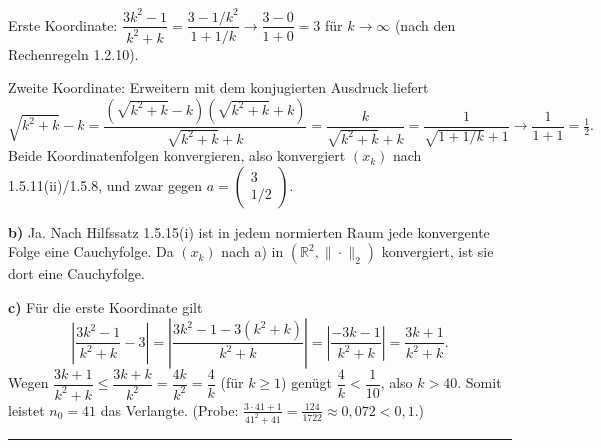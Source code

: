 \documentclass[a4paper,11pt]{article}
\begin{document}
Erste Koordinate: $\dfrac{3k^2-1}{k^2+k}=\dfrac{3-1/k^2}{1+1/k}\to \dfrac{3-0}{1+0}=3$ für $k\to\infty$ (nach den Rechenregeln 1.2.10).

Zweite Koordinate: Erweitern mit dem konjugierten Ausdruck liefert
\[ \sqrt{k^2+k}-k=\frac{(\sqrt{k^2+k}-k)(\sqrt{k^2+k}+k)}{\sqrt{k^2+k}+k}=\frac{k}{\sqrt{k^2+k}+k}=\frac{1}{\sqrt{1+1/k}+1}\to\frac{1}{1+1}=\tfrac12. \]
Beide Koordinatenfolgen konvergieren, also konvergiert $(x_k)$ nach 1.5.11(ii)/1.5.8, und zwar gegen $a=\begin{pmatrix}3\\ 1/2\end{pmatrix}$.

\textbf{b)} Ja. Nach Hilfssatz 1.5.15(i) ist in jedem normierten Raum jede konvergente Folge eine Cauchyfolge. Da $(x_k)$ nach a) in $(\mathbb{R}^2,\|\cdot\|_2)$ konvergiert, ist sie dort eine Cauchyfolge.

\textbf{c)} Für die erste Koordinate gilt
\[ \left|\frac{3k^2-1}{k^2+k}-3\right|=\left|\frac{3k^2-1-3(k^2+k)}{k^2+k}\right|=\left|\frac{-3k-1}{k^2+k}\right|=\frac{3k+1}{k^2+k}. \]
Wegen $\dfrac{3k+1}{k^2+k}\le\dfrac{3k+k}{k^2}=\dfrac{4k}{k^2}=\dfrac{4}{k}$ (für $k\ge1$) genügt $\dfrac{4}{k}<\dfrac{1}{10}$, also $k>40$. Somit leistet $n_0=41$ das Verlangte. (Probe: $\tfrac{3\cdot41+1}{41^2+41}=\tfrac{124}{1722}\approx0{,}072<0{,}1$.)\par\bigskip\hrule\bigskip
\end{document}
